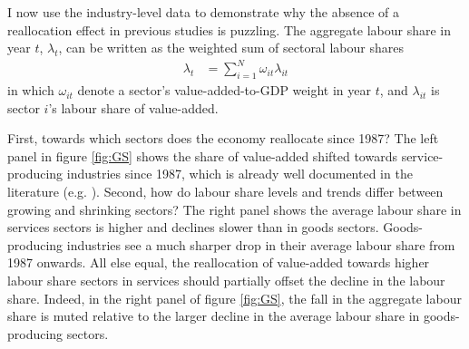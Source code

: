 I now use the industry-level data to demonstrate why the absence of a reallocation effect in previous studies is puzzling. The aggregate labour share in year $t$, $\lambda_{t}$, can be written as the weighted sum of sectoral labour shares
\begin{equation}
\begin{split}
    \lambda_{t} &= \sum_{i=1}^{N}\omega_{it}\lambda_{it}
\end{split}
\label{eqn:weighted_ls_second}
\end{equation}
in which $\omega_{it}$ denote a sector's value-added-to-GDP weight in year $t$, and $\lambda_{it}$ is sector $i$'s labour share of value-added.

\noindent First, towards which sectors does the economy reallocate since 1987? The left panel in figure \ref{fig:GS} shows the share of value-added shifted towards service-producing industries since 1987, which is already well documented in the literature (e.g. \citet{herrendorfTwoPerspectivesPreferences2013, bridgmanLaborShareMarkups2023}). Second, how do labour share levels and trends differ between growing and shrinking sectors? The right panel shows the average labour share in services sectors is higher and declines slower than in goods sectors. Goods-producing industries see a much sharper drop in their average labour share from 1987 onwards. All else equal, the reallocation of value-added towards higher labour share sectors in services should partially offset the decline in the labour share. Indeed, in the right panel of figure \ref{fig:GS}, the fall in the aggregate labour share is muted relative to the larger decline in the average labour share in goods-producing sectors.


